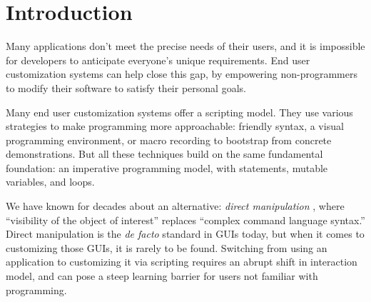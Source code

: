 \documentclass[sigplan,screen,10pt,anonymous,review]{acmart}
\begin{document}


\maketitle

\hypertarget{introduction}{%
\section{Introduction}\label{introduction}}

Many applications don't meet the precise needs of their users, and it is
impossible for developers to anticipate everyone's unique requirements.
End user customization systems can help close this gap, by empowering
non-programmers to modify their software to satisfy their personal
goals.

Many end user customization systems
\citep{cook2007, bolin2005, leshed2008, chasins2018} offer a scripting
model. They use various strategies to make programming more
approachable: friendly syntax, a visual programming environment, or
macro recording to bootstrap from concrete demonstrations. But all these
techniques build on the same fundamental foundation: an imperative
programming model, with statements, mutable variables, and loops.

We have known for decades about an alternative: \emph{direct
manipulation} \citep{shneiderman1983}, where ``visibility of the object
of interest'' replaces ``complex command language syntax.'' Direct
manipulation is the \emph{de facto} standard in GUIs today, but when it
comes to customizing those GUIs, it is rarely to be found. Switching
from using an application to customizing it via scripting requires an
abrupt shift in interaction model, and can pose a steep learning barrier
for users not familiar with programming.
\end{document}
